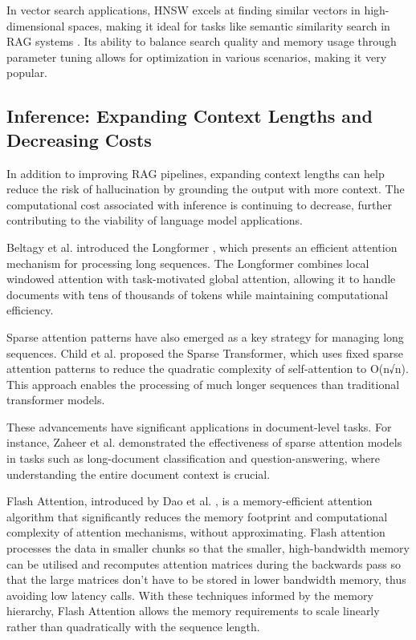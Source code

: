 \documentclass[a4paper, oneside]{discothesis}
\begin{document}
In vector search applications, HNSW excels at finding similar vectors in high-dimensional spaces, making it ideal for tasks like semantic similarity search in RAG systems \cite{johnson2019billion}. Its ability to balance search quality and memory usage through parameter tuning allows for optimization in various scenarios, making it very popular. 

\subsection{Inference: Expanding Context Lengths and Decreasing Costs}
In addition to improving RAG pipelines, expanding context lengths can help reduce the risk of hallucination by grounding the output with more context. The computational cost associated with inference is continuing to decrease, further contributing to the viability of language model applications. 

Beltagy et al. introduced the Longformer \cite{beltagy2020longformer}, which presents an efficient attention mechanism for processing long sequences. The Longformer combines local windowed attention with task-motivated global attention, allowing it to handle documents with tens of thousands of tokens while maintaining computational efficiency.

Sparse attention patterns have also emerged as a key strategy for managing long sequences. Child et al. \cite{child2019generating} proposed the Sparse Transformer, which uses fixed sparse attention patterns to reduce the quadratic complexity of self-attention to O(n√n). This approach enables the processing of much longer sequences than traditional transformer models.

These advancements have significant applications in document-level tasks. For instance, Zaheer et al. \cite{zaheer2020big} demonstrated the effectiveness of sparse attention models in tasks such as long-document classification and question-answering, where understanding the entire document context is crucial.

Flash Attention, introduced by Dao et al. \cite{dao2022flashattention}, is a memory-efficient attention algorithm that significantly reduces the memory footprint and computational complexity of attention mechanisms, without approximating. Flash attention processes the data in smaller chunks so that the smaller, high-bandwidth memory can be utilised and recomputes attention matrices during the backwards pass so that the large matrices don't have to be stored in lower bandwidth memory, thus avoiding low latency calls. With these techniques informed by the memory hierarchy, Flash Attention allows the memory requirements to scale linearly rather than quadratically with the sequence length. 
\end{document}
